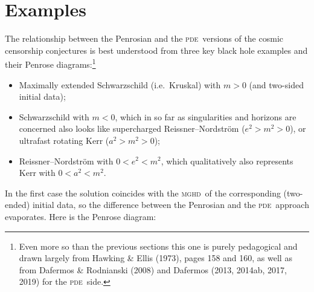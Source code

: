 \documentclass[12pt]{article}
\newcommand{\mghd}{\textsc{mghd}}
\newcommand{\pde}{\textsc{pde}}
\begin{document}
 \section{Examples}\label{examples}
The relationship between the Penrosian and the \pde\ versions of the cosmic censorship conjectures is best understood from  three key black hole examples and their Penrose diagrams:\footnote{Even more so than the previous sections this one is purely pedagogical and drawn largely from  Hawking \& Ellis (1973), pages 158 and 160, as well as from Dafermos \& Rodnianski (2008) and Dafermos (2013, 2014ab, 2017, 2019) for the \pde\ side.}
\begin{itemize}
\item  Maximally extended Schwarz\-schild  (i.e.\ Kruskal) with $m>0$ (and two-sided initial data);
\item  Schwarz\-schild  with  $m<0$, which in so far as singularities and horizons are concerned also looks like supercharged Reissner--Nordstr\"{o}m  ($e^2>m^2>0$), or ultrafast rotating Kerr ($a^2>m^2>0$);
\item  Reissner--Nordstr\"{o}m with $0<e^2<m^2$, which  qualitatively also represents Kerr with $0<a^2<m^2$.
\end{itemize}
In the first case the  solution coincides with the \mghd\ of the corresponding (two-ended) initial data, so  the difference between the Penrosian and the \pde\ approach evaporates. Here is the Penrose diagram:
\end{document}
